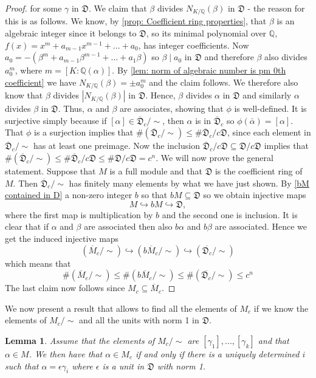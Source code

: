 \documentclass{article}
\newtheorem{lemma}{Lemma}[section]
\newcommand{\mfrak}[1]{\mathfrak{#1}}
\newcommand{\mbb}[1]{\mathbb{#1}}
\numberwithin{equation}{section}
\begin{document}
\begin{proof}
    for some $\gamma$ in $\mfrak D$. We claim that $\beta$ divides $N_{K/\mbb Q}(\beta)$ in $\mathfrak D$ - the reason for this is as follows. We know, by \cref{prop: Coefficient ring properties}, that $\beta$ is an algebraic integer since it belongs to $\mfrak D$, so its minimal polynomial over $\mbb Q$, $f(x) = x^m + a_{m-1}x^{m-1} + ... + a_0$, has integer coefficients. Now $a_0 = -(\beta^m + a_{m-1}\beta^{m-1} + ... + a_1\beta)$ so $\beta \mid a_0$ in $\mfrak D$ and therefore $\beta$ also divides $a_0^m$, where $m = [K : \mbb Q(\alpha)]$. By \cref{lem: norm of algebraic number is pm 0th coefficient} we have $N_{K/\mbb Q}(\beta) = \pm a_0^m$ and the claim follows. We therefore also know that $\beta$ divides $|N_{K/\mbb Q}(\beta)|$ in $\mfrak D$. Hence, $\beta$ divides $\alpha$ in $\mfrak D$ and similarly $\alpha$ divides $\beta$ in $\mfrak D$. Thus, $\alpha$ and $\beta$ are associates, showing that $\phi$ is well-defined. It is surjective simply because if $[\alpha] \in \overline {\mfrak D}_c / \sim$, then $\alpha$ is in $\overline {\mfrak D}_c$ so $\phi(\bar \alpha) = [\alpha]$. That $\phi$ is a surjection implies that $\# (\overline {\mfrak D}_c / \sim) \leq \# \overline {\mfrak D}_c / c \mfrak D$, since each element in $\overline {\mfrak D}_c /\sim$ has at least one preimage. Now the inclusion $\overline {\mfrak D}_c / c \mfrak D \subseteq \mfrak D / c \mfrak D$ implies that $\# (\overline {\mfrak D}_c / \sim) \leq \# \overline {\mfrak D}_c / c \mfrak D \leq \# \mfrak D / c \mfrak D = c^n$. We will now prove the general statement. Suppose that $M$ is a full module and that $\mfrak D$ is the coefficient ring of $M$. Then $\overline {\mfrak{D}}_c / \sim$ has finitely many elements by what we have just shown. By \cref{bM contained in D} a non-zero integer $b$ so that $bM \subseteq \mfrak D$ so we obtain injective maps
    $$M \hookrightarrow bM \hookrightarrow \mfrak D,$$
    where the first map is multiplication by $b$ and the second one is inclusion. It is clear that if $\alpha$ and $\beta$ are associated then also $b\alpha$ and $b\beta$ are associated. Hence we get the induced injective maps
    $$(\overline M_c / \sim) \hookrightarrow (b\overline M_c / \sim) \hookrightarrow (\overline {\mfrak D_c} / \sim) $$
    which means that $$\# (\overline M_c / \sim) \leq \# (b\overline M_c / \sim) \leq \# (\overline {\mfrak D_c} / \sim) \leq c^n$$
    The last claim now follows since $M_c \subseteq \overline M_c$.
\end{proof}
We now present a result that allows to find all the elements of $M_c$ if we know the elements of $M_c / \sim$ and all the units with norm 1 in $\mfrak D$.
\begin{lemma} \label{lem: writing of elements of Mc}
    Assume that the elements of $M_c / \sim$ are $[\gamma_1], ..., [\gamma_k]$ and that $\alpha \in M$. We then have that $\alpha \in M_c$ if and only if there is a uniquely determined $i$ such that $\alpha = \epsilon \gamma_i$ where $\epsilon$ is a unit in $\mfrak D$ with norm 1.
\end{lemma}
\end{document}
